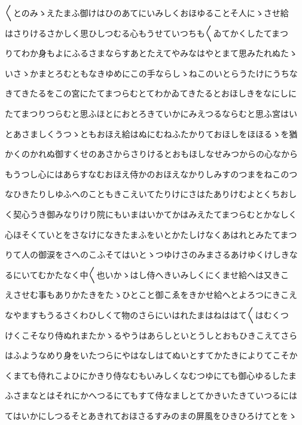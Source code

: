 \documentclass[a4paper,11pt,landscape]{ltjtarticle}
\begin{document}
\par\medskip
〱とのみゝえたまふ御けはひのあてにいみしくおほゆることそ人にゝさせ給
\par\medskip
はさりけるさかしく思ひしつむる心もうせていつちも〱ゐてかくしたてまつ
\par\medskip
りてわか身もよにふるさまならすあとたえてやみなはやとまて思みたれぬたゝ
\par\medskip
いさゝかまとろむともなきゆめにこの手ならしゝねこのいとらうたけにうちな
\par\medskip
きてきたるをこの宮にたてまつらむとてわかゐてきたるとおほしきをなにしに
\par\medskip
たてまつりつらむと思ふほとにおとろきていかにみえつるならむと思ふ宮はい
\par\medskip
とあさましくうつゝともおほえ給はぬにむねふたかりておほしをほほるゝを猶
\par\medskip
かくのかれぬ御すくせのあさからさりけるとおもほしなせみつからの心なから
\par\medskip
もうつし心にはあらすなむおほえ侍かのおほえなかりしみすのつまをねこのつ
\par\medskip
なひきたりしゆふへのこともきこえいてたりけにさはたありけむよとくちおし
\par\medskip
く契心うき御みなりけり院にもいまはいかてかはみえたてまつらむとかなしく
\par\medskip
心ほそくていとをさなけになきたまふをいとかたしけなくあはれとみたてまつ
\par\medskip
りて人の御涙をさへのこふそてはいとゝつゆけさのみまさるあけゆくけしきな
\par\medskip
るにいてむかたなく中〱也いかゝはし侍へきいみしくにくませ給へは又きこ
\par\medskip
えさせむ事もありかたきをたゝひとこと御こゑをきかせ給へとよろつにきこえ
\par\medskip
なやますもうるさくわひしくて物のさらにいはれたまはねははて〱はむくつ
\par\medskip
けくこそなり侍ぬれまたかゝるやうはあらしといとうしとおもひきこえてさら
\par\medskip
はふようなめり身をいたつらにやはなしはてぬいとすてかたきによりてこそか
\par\medskip
くまても侍れこよひにかきり侍なむもいみしくなむつゆにても御心ゆるしたま
\par\medskip
ふさまなとはそれにかへつるにてもすて侍なましとてかきいたきていつるには
\par\medskip
てはいかにしつるそとあきれておほさるすみのまの屏風をひきひろけてとをゝ
\par\medskip
\end{document}

